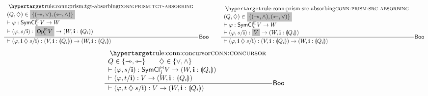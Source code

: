 \documentclass[a4paper]{article}
\begin{document}
\begin{figure}
	\[
		\inferencel{conn:prism:tgt-absorbing}{
			(Q, \opA) \in \mathemph{\accol{(\jet, \vee), (\tej, \wedge)}} \\
			\sez \vfi : \UFsymcube_i V \to W \\
			\sez (\vfi, s / \dm i) : \mathemph{\Opcube_i V} \to (W, \dm i : \rival{Q_i})
		}{
			\sez (\vfi, \dm i \opA s / \dm i) : (V, \dm i : \rival{Q_i}) \to (W, \dm i : \rival{Q_i})
		}{$\booleanalg$}
		\qquad
		\inferencel{conn:prism:src-absorbing}{
			(Q, \opA) \in \mathemph{\accol{(\jet, \wedge), (\tej, \vee)}} \\
			\sez \vfi : \UFsymcube_i V \to W \\
			\sez (\vfi, s / \dm i) : \mathemph{V} \to (W, \dm i : \rival{Q_i})
		}{
			\sez (\vfi, \dm i \opA s / \dm i) : (V, \dm i : \rival{Q_i}) \to (W, \dm i : \rival{Q_i})
		}{$\booleanalg$}
	\]
	\[
		\inferencel{conn:concursor}{
			Q \in \accol{\jet, \tej} \qquad
			\opA \in \accol{{\vee}, {\wedge}} \\
			\sez (\vfi, s / \dm i) : \UFsymcube_j V \to (W, \dm i : \rival{Q_i}) \\
			\sez (\vfi, t / \dm i) : V \to (W, \dm i : \rival{Q_i})
		}{
			\sez (\vfi, t \opA s / \dm i) : V \to (W, \dm i : \rival{Q_i})
		}{$\booleanalg$}
	\]

\end{figure}
\end{document}
